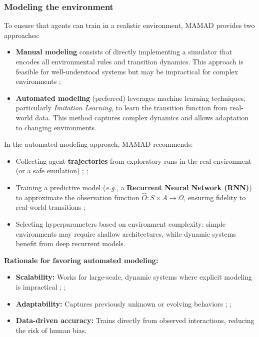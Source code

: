 \documentclass[pdflatex,sn-mathphys-num]{sn-jnl}%
\theoremstyle{thmstyleone}%
\theoremstyle{thmstyletwo}%
\theoremstyle{thmstylethree}%
\begin{document}
\subsubsection{Modeling the environment}
To ensure that agents can train in a realistic environment, MAMAD provides two approaches:
\begin{itemize}
    \item \textbf{Manual modeling} consists of directly implementing a simulator that encodes all environmental rules and transition dynamics. This approach is feasible for well-understood systems but may be impractical for complex environments ;
    \item \textbf{Automated modeling} (preferred) leverages machine learning techniques, particularly \textit{Imitation Learning}, to learn the transition function from real-world data. This method captures complex dynamics and allows adaptation to changing environments.
\end{itemize}

In the automated modeling approach, MAMAD recommends:
\begin{itemize}
    \item Collecting agent \textbf{trajectories} from exploratory runs in the real environment (or a safe emulation) ; ;
    \item Training a predictive model (\textit{e.g.}, a \textbf{Recurrent Neural Network (RNN)}) to approximate the observation function $\hat{O}: S \times A \to \Omega$, ensuring fidelity to real-world transitions ;
    \item Selecting hyperparameters based on environment complexity: simple environments may require shallow architectures, while dynamic systems benefit from deep recurrent models.
\end{itemize}

\noindent \textbf{Rationale for favoring automated modeling:}
\begin{itemize}
    \item \textbf{Scalability:} Works for large-scale, dynamic systems where explicit modeling is impractical ; ;
    \item \textbf{Adaptability:} Captures previously unknown or evolving behaviors ; ;
    \item \textbf{Data-driven accuracy:} Trains directly from observed interactions, reducing the risk of human bias.
\end{itemize}
\end{document}
